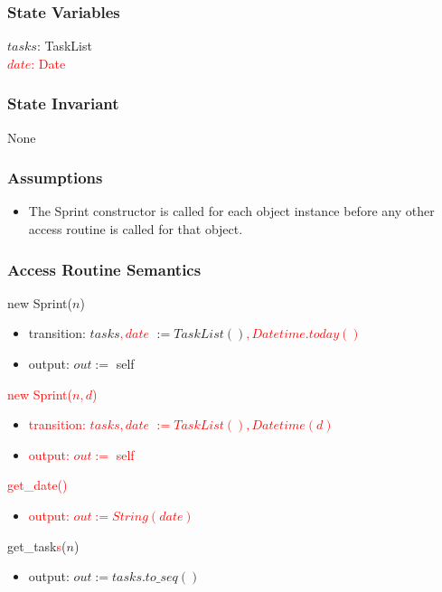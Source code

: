 \documentclass[12pt, titlepage]{article}
\begin{document}
\subsubsection*{State Variables}
$tasks$: TaskList\\
\textcolor{red}{$date$: Date}
\subsubsection*{State Invariant}
None

\subsubsection*{Assumptions}
\begin{itemize}
  \item The Sprint constructor is called for each object instance before any other access routine is called for that object.
\end{itemize}

\subsubsection*{Access Routine Semantics}
\noindent new Sprint($n$)
\begin{itemize}
    \item transition: $tasks$\textcolor{red}{$, date$} $:= TaskList()$\textcolor{red}{$, Datetime.today()$}
    \item output: $out :=$ self
\end{itemize}

\noindent \textcolor{red}{new Sprint($n, d$)}
\begin{itemize}
    \item \textcolor{red}{transition: $tasks$\textcolor{red}{$, date$} $:= TaskList()$\textcolor{red}{$, Datetime(d)$}}
    \item \textcolor{red}{output: $out :=$ self}
\end{itemize}

\noindent \textcolor{red}{get\_date()}
\begin{itemize}
    \item \textcolor{red}{output: $out := String(date)$}
\end{itemize}

\noindent get\_task\textcolor{red}{s}(\sout{$n$})
\begin{itemize}
    \item output: $out := tasks.to\_seq()$
\end{itemize}
\end{document}
